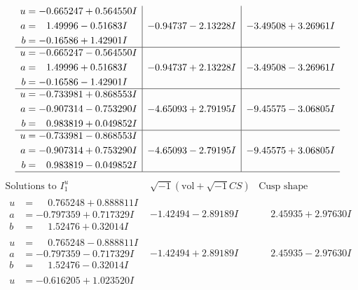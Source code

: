 \documentclass[1p]{elsarticle_modified}
\theoremstyle{definition}
\newcommand{\I}{\sqrt{-1}}
\begin{document}
$$\begin{array}{c|c|c}
\begin{aligned}
u &= -0.665247 + 0.564550 I \\
a &= \phantom{-}1.49996 - 0.51683 I \\
b &= -0.16586 + 1.42901 I\end{aligned}
 & -0.94737 - 2.13228 I & -3.49508 + 3.26961 I \\ \hline\begin{aligned}
u &= -0.665247 - 0.564550 I \\
a &= \phantom{-}1.49996 + 0.51683 I \\
b &= -0.16586 - 1.42901 I\end{aligned}
 & -0.94737 + 2.13228 I & -3.49508 - 3.26961 I \\ \hline\begin{aligned}
u &= -0.733981 + 0.868553 I \\
a &= -0.907314 - 0.753290 I \\
b &= \phantom{-}0.983819 + 0.049852 I\end{aligned}
 & -4.65093 + 2.79195 I & -9.45575 - 3.06805 I \\ \hline\begin{aligned}
u &= -0.733981 - 0.868553 I \\
a &= -0.907314 + 0.753290 I \\
b &= \phantom{-}0.983819 - 0.049852 I\end{aligned}
 & -4.65093 - 2.79195 I & -9.45575 + 3.06805 I\\
 \hline 
 \end{array}$$\newpage$$\begin{array}{c|c|c}  
\text{Solutions to }I^u_{1}& \I (\text{vol} + \sqrt{-1}CS) & \text{Cusp shape}\\
 \hline 
\begin{aligned}
u &= \phantom{-}0.765248 + 0.888811 I \\
a &= -0.797359 + 0.717329 I \\
b &= \phantom{-}1.52476 + 0.32014 I\end{aligned}
 & -1.42494 - 2.89189 I & \phantom{-}2.45935 + 2.97630 I \\ \hline\begin{aligned}
u &= \phantom{-}0.765248 - 0.888811 I \\
a &= -0.797359 - 0.717329 I \\
b &= \phantom{-}1.52476 - 0.32014 I\end{aligned}
 & -1.42494 + 2.89189 I & \phantom{-}2.45935 - 2.97630 I \\ \hline\begin{aligned}
u &= -0.616205 + 1.023520 I \\

\end{aligned}
\end{array}$$
\end{document}
